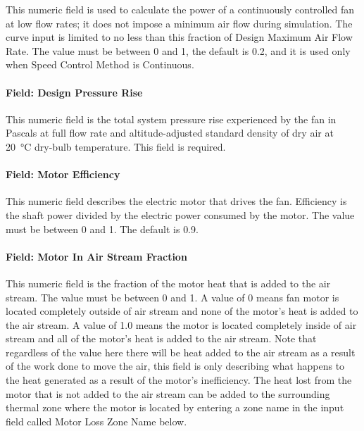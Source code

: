 This numeric field is used to calculate the power of a continuously controlled fan at low flow rates; it does not impose a minimum air flow during simulation. The curve input is limited to no less than this fraction of Design Maximum Air Flow Rate. The value must be between 0 and 1, the default is 0.2, and it is used only when Speed Control Method is Continuous.

\paragraph{Field: Design Pressure Rise}\label{field-pressure-fansysmodel}

This numeric field is the total system pressure rise experienced by the fan in Pascals at full flow rate and altitude-adjusted standard density of dry air at \SI{20}{\celsius} dry-bulb temperature. This field is required.

\paragraph{Field: Motor Efficiency}\label{field-motor-eff-fansysmodel}

This numeric field describes the electric motor that drives the fan.  Efficiency is the shaft power divided by the electric power consumed by the motor.  The value must be between 0 and 1. The default is 0.9.

\paragraph{Field: Motor In Air Stream Fraction}\label{field-motor-in-air-stream-fansysmodel}

This numeric field is the fraction of the motor heat that is added to the air stream.  The value must be between 0 and 1.  A value of 0 means fan motor is located completely outside of air stream and none of the motor's heat is added to the air stream.  A value of 1.0 means the motor is located completely inside of air stream and all of the motor's heat is added to the air stream.  Note that regardless of the value here there will be heat added to the air stream as a result of the work done to move the air, this field is only describing what happens to the heat generated as a result of the motor's inefficiency. The heat lost from the motor that is not added to the air stream can be added to the surrounding thermal zone where the motor is located by entering a zone name in the input field called Motor Loss Zone Name below.

